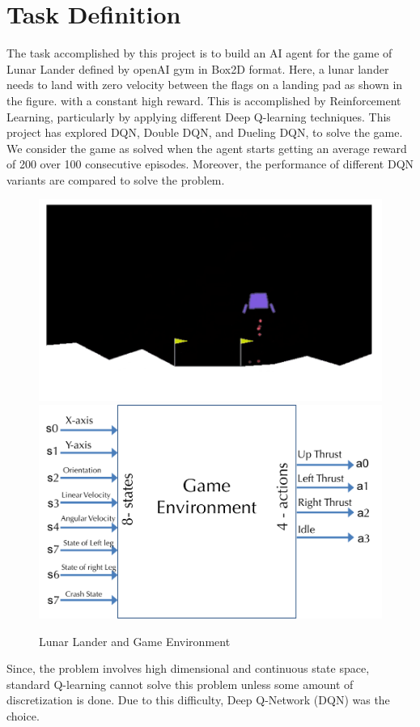 \section{Task Definition}
\label{intro}

The task accomplished by this project is to build an AI agent for the game of Lunar Lander defined by openAI gym in Box2D format. Here, a lunar lander needs to land with zero velocity between the flags on a landing pad as shown in the figure. with a constant high reward. This is accomplished by Reinforcement Learning, particularly by applying different Deep Q-learning techniques. This project has explored  DQN\citep{D}, Double DQN\citep{DoubleQ-learning}, and Dueling DQN\citep{Dueling}, to solve the game. We consider the game as solved when the agent starts getting an average reward of 200 over 100 consecutive episodes. Moreover, the performance of different DQN variants are compared to solve the problem. \\


\begin{figure}[!ht]
\centering
\includegraphics[scale=0.50,width=0.50\columnwidth]{figures/game.png}%
\includegraphics[scale=0.50,width=0.50\columnwidth]{figures/game_env.png}%
\caption{ Lunar Lander and Game Environment }%
\label{fig:Visualization}%
\end{figure}

Since, the problem involves high dimensional and continuous state
space, standard Q-learning cannot solve this problem unless some amount of discretization is done. Due to this difficulty, Deep Q-Network (DQN) was the choice. 




